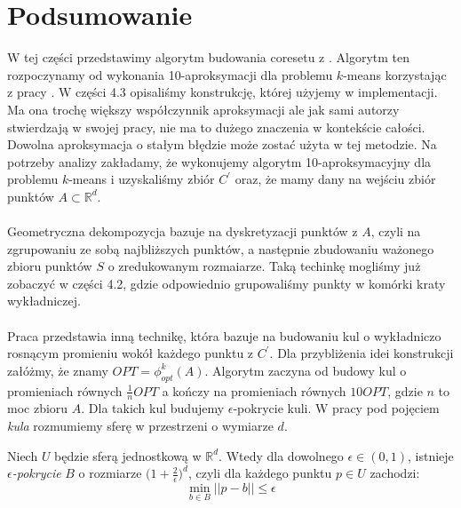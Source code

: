 \section{Podsumowanie}

W tej części przedstawimy algorytm budowania coresetu z \cite{DBLP:journals/ki/MunteanuS18}.
Algorytm ten rozpoczynamy od wykonania 10-aproksymacji dla problemu $k$-means korzystając z pracy \cite{Arya2004LocalSH}.
W części 4.3 opisaliśmy konstrukcję, której użyjemy w implementacji.
Ma ona trochę większy współczynnik aproksymacji ale jak sami autorzy \cite{DBLP:journals/ki/MunteanuS18} stwierdzają w swojej pracy, nie ma to dużego znaczenia w kontekście całości.
Dowolna aproksymacja o stałym błędzie może zostać użyta w tej metodzie.
Na potrzeby analizy zakładamy, że wykonujemy algorytm 10-aproksymacyjny dla problemu $k$-means i uzyskaliśmy zbiór $C^{'}$ oraz, że mamy dany na wejściu zbiór punktów $A \subset \mathbb{R}^d$.
\\~\\
Geometryczna dekompozycja bazuje na dyskretyzacji punktów z $A$, czyli na zgrupowaniu ze sobą najbliższych punktów, a następnie zbudowaniu ważonego zbioru punktów $S$ o zredukowanym rozmaiarze.
Taką techinkę mogliśmy już zobaczyć w części 4.2, gdzie odpowiednio grupowaliśmy punkty w komórki kraty wykładniczej.
\\~\\
Praca \cite{DBLP:journals/ki/MunteanuS18} przedstawia inną technikę, która bazuje na budowaniu kul o wykładniczo rosnącym promieniu wokół każdego punktu z $C^{'}$.
Dla przybliżenia idei konstrukcji załóżmy, że znamy $OPT = \phi_{opt}^{k}(A)$.
Algorytm zaczyna od budowy kul o promieniach równych $\frac{1}{n}OPT$ a kończy na promieniach równych $10 OPT$, gdzie $n$ to moc zbioru $A$.
Dla takich kul budujemy $\epsilon$-pokrycie kuli.
W pracy pod pojęciem \textit{kula} rozmumiemy sferę w przestrzeni o wymiarze $d$.

\begin{lemma}{\cite{pisier_1989}}
    Niech $U$ będzie sferą jednostkową w $\mathbb{R}^{d}$.
    Wtedy dla dowolnego $\epsilon \in (0,1)$, istnieje \textit{$\epsilon$-pokrycie} $B$ o rozmiarze $\Big(1 +\frac{2}{\epsilon}\Big)^{d}$, czyli dla każdego punktu $p \in U$ zachodzi:
    \begin{equation}
        \min_{b \in B} ||p-b|| \leq \epsilon
    \end{equation}
\end{lemma}

